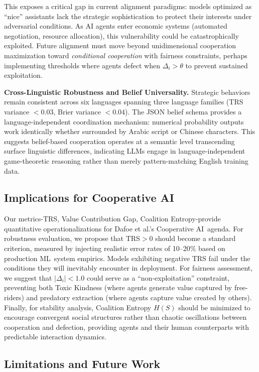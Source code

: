 \documentclass{uai2026} %
\begin{document}
This exposes a critical gap in current alignment paradigms: models optimized as ``nice'' assistants lack the strategic sophistication to protect their interests under adversarial conditions. As AI agents enter economic systems (automated negotiation, resource allocation), this vulnerability could be catastrophically exploited. Future alignment must move beyond unidimensional cooperation maximization toward \textit{conditional cooperation} with fairness constraints, perhaps implementing thresholds where agents defect when $\Delta_i > \theta$ to prevent sustained exploitation.

\textbf{Cross-Linguistic Robustness and Belief Universality.} Strategic behaviors remain consistent across six languages spanning three language families (TRS variance $< 0.03$, Brier variance $< 0.04$). The JSON belief schema provides a language-independent coordination mechanism: numerical probability outputs work identically whether surrounded by Arabic script or Chinese characters. This suggests belief-based cooperation operates at a semantic level transcending surface linguistic differences, indicating LLMs engage in language-independent game-theoretic reasoning rather than merely pattern-matching English training data.

\subsection{Implications for Cooperative AI}

Our metrics-TRS, Value Contribution Gap, Coalition Entropy-provide quantitative operationalizations for Dafoe et al.'s \citep{dafoe2020open} Cooperative AI\ agenda. For robustness evaluation, we propose that TRS$>0$ should become a standard criterion, measured by injecting realistic error rates of 10--20\% based on production ML\ system empirics. Models exhibiting negative TRS fail under the conditions they will inevitably encounter in deployment. For fairness assessment, we suggest that $|\Delta_i| < 1.0$ could serve as a ``non-exploitation'' constraint, preventing both Toxic Kindness (where agents generate value captured by free-riders) and predatory extraction (where agents capture value created by others). Finally, for stability analysis, Coalition Entropy $H(S)$ should be minimized to encourage convergent social structures rather than chaotic oscillations between cooperation and defection, providing agents and their human counterparts with predictable interaction dynamics.

\subsection{Limitations and Future Work}
\end{document}
